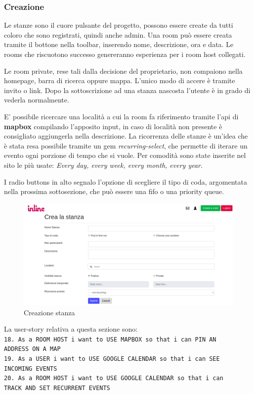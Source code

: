 	\subsubsection{Creazione}
	Le stanze sono il cuore pulsante del progetto, possono essere create da tutti coloro che sono registrati, quindi anche admin. Una room può essere creata tramite il bottone nella toolbar, inserendo nome, descrizione, ora e data. Le rooms che riscuotono successo genereranno esperienza per i room host collegati. 
	
	Le room private, rese tali dalla decisione del proprietario, non compaiono nella homepage, barra di ricerca oppure mappa. L'unico modo di accere è tramite invito o link. Dopo la sottoscrizione ad una stanza nascosta l'utente è in grado di vederla normalmente.
	
	E' possibile ricercare una località a cui la room fa riferimento tramite l'api di \textbf{mapbox} compilando l'apposito input, in caso di località non presente è consigliato aggiungerla nella descrizione. La ricorrenza delle stanze è un'idea che è stata resa possibile tramite un gem \textit{recurring-select}, che permette di iterare un evento ogni porzione di tempo che si vuole. Per comodità sono state inserite nel sito le più usate: \textit{Every day, every week, every month, every year}.
	
	I radio buttons in alto segnalo l'opzione di scegliere il tipo di coda, argomentata nella prossima sottosezione, che può essere una fifo o una priority queue.
	\begin{figure}[H]
		\includegraphics[width=\columnwidth]{./media/image8.png}
		\caption{Creazione stanza}
	\end{figure}
	La user-story relativa a questa sezione sono:\\
	\texttt{18. As a ROOM HOST i want to USE MAPBOX so that i can PIN AN \\ ADDRESS ON A MAP}\\
	\texttt{19. As a USER i want to USE GOOGLE CALENDAR so that i can SEE \\ INCOMING EVENTS}\\
	\texttt{20. As a ROOM HOST i want to USE GOOGLE CALENDAR so that i can \\ TRACK AND SET RECURRENT EVENTS}\\\\
	

